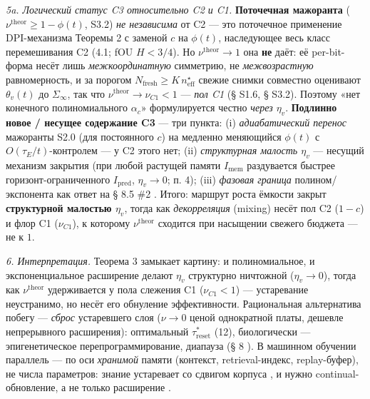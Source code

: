 \documentclass[12pt]{iopart}
\begin{document}
\emph{5a. Логический статус C3 относительно C2 и C1.} \textbf{Поточечная мажоранта} (\(\nu^{\text{theor}} \ge 1-\phi(t)\), S3.2) \emph{не независима} от C2 --- это поточечное применение DPI-механизма Теоремы 2 с заменой \(c\) на \(\phi(t)\), наследующее весь класс перемешивания C2 (4.1; fOU \(H<3/4\)). Но \(\nu^{\text{theor}} \to 1\) она \textbf{не} даёт: её per-bit-форма несёт лишь \emph{межкоординатную} симметрию, не \emph{межвозрастную} равномерность, и за порогом \(N_{\text{fresh}} \ge K\,n_{\text{eff}}^\star\) свежие снимки совместно оценивают \(\theta_v(t)\) до \(\Sigma_\infty\), так что \(\nu^{\text{theor}} \to \nu_{C1} < 1\) --- \emph{пол C1} (§ S1.6, § S3.2). Поэтому «нет конечного полиномиального \(\alpha_c\)» формулируется честно \emph{через \(\eta_v\)}. \textbf{Подлинно новое / несущее содержание C3} --- три пункта: (i) \emph{адиабатический перенос} мажоранты S2.0 (для постоянного \(c\)) на медленно меняющийся \(\phi(t)\) с \(O(\tau_E/t)\)-контролем --- у C2 этого нет; (ii) \emph{структурная малость \(\eta_v\)} --- несущий механизм закрытия (при любой растущей памяти \(I_{\text{mem}}\) раздувается быстрее горизонт-ограниченного \(I_{\text{pred}}\), \(\eta_v \to 0\); п. 4); (iii) \emph{фазовая граница} полином/экспонента как ответ на § 8.5 \#2 \cite{Andriishin2026b}. Итого: маршрут роста ёмкости закрыт \textbf{структурной малостью \(\eta_v\)}, тогда как \emph{декорреляция} (mixing) несёт пол C2 (\(1-c\)) и флор C1 (\(\nu_{C1}\)), к которому \(\nu^{\text{theor}}\) сходится при насыщении свежего бюджета --- не к \(1\).



\emph{6. Интерпретация.} Теорема 3 замыкает картину: и полиномиальное, и экспоненциальное расширение делают \(\eta_v\) структурно ничтожной (\(\eta_v \to 0\)), тогда как \(\nu^{\text{theor}}\) удерживается у пола слежения C1 (\(\nu_{C1} < 1\)) --- устаревание неустранимо, но несёт его обнуление эффективности. Рациональная альтернатива побегу --- \emph{сброс} устаревшего слоя (\(\nu \to 0\) ценой однократной платы, дешевле непрерывного расширения): оптимальный \(\tau_{\text{reset}}^*\) \cite{Andriishin2026b} (12), биологически --- эпигенетическое перепрограммирование, диапауза (§ 8 \cite{Andriishin2026b}). В машинном обучении параллель --- по оси \emph{хранимой} памяти (контекст, retrieval-индекс, replay-буфер), не числа параметров: знание устаревает со сдвигом корпуса \cite{Lazaridou2021,Dhingra2022}, и нужно continual-обновление, а не только расширение \cite{Gama2014}.
\end{document}
